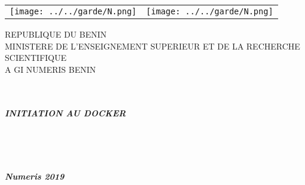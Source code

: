		\begin{titlepage}
		\begin{center}
			\begin{tabular}{p{12cm}p{12cm}}
				\texttt{[image: ../../garde/N.png]}
				&
				\texttt{[image: ../../garde/N.png]}
			\end{tabular}
			\begin{bf}
				REPUBLIQUE DU BENIN\\
				\vspace{0.5cm}
				MINISTERE DE L'ENSEIGNEMENT SUPERIEUR ET DE LA RECHERCHE SCIENTIFIQUE\\A GI
				\vspace{0.5cm}
				NUMERIS BENIN\\
				
				\vspace{0.5cm}
			\end{bf}
			\vspace{1cm}
			\textbf{{}}\\
			\vspace{0.75cm}
			\hrulefill\\
			\textbf{\textsl{INITIATION AU DOCKER}}\\
			\hrulefill\\
			\vspace{1cm}
			\\[1ex]
			
			\\
			\vspace{5cm}
			\begin{center}
				\textbf{\textsl{ Numeris 2019}}
			\end{center}
			
		\end{center}
	\end{titlepage}